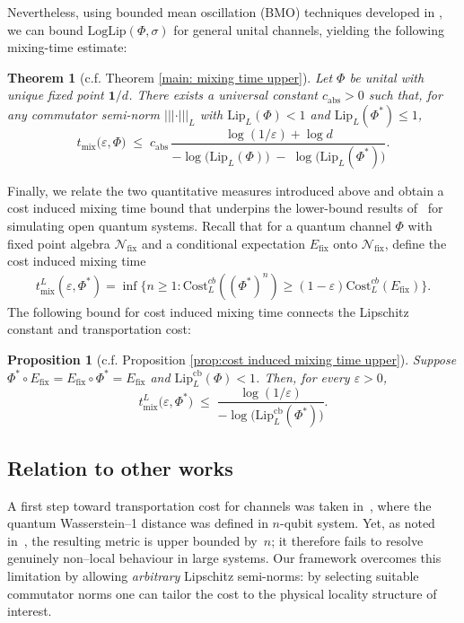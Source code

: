 \documentclass[11pt,reqno]{amsart}
\numberwithin{equation}{section}
\newtheorem{prop}[lemma]{Proposition}
\newtheorem{theorem}[lemma]{Theorem}
\newcommand{\mc}{\mathcal}
\newcommand{\Lip}{\mathrm{Lip}}
\newcommand{\Cost}{\mathrm{Cost}}
\newcommand{\fix}{\mathrm{fix}}
\begin{document}
Nevertheless, using bounded mean oscillation (BMO) techniques developed in \cite{caspers2020bmo}, we can bound $\mathrm{LogLip}(\Phi,\sigma)$ for general unital channels, yielding the following mixing-time estimate:
\begin{theorem}[c.f. Theorem \ref{main: mixing time upper}]\label{thm:mixing-time}
  Let $\Phi$ be unital with unique fixed point $\mathbf1/d$.  There exists a universal constant $c_{\mathrm{abs}}>0$ such that, for any commutator semi-norm $|||\cdot|||_{L}$ with $\Lip_{L}(\Phi)<1$ and $\Lip_{L}(\Phi^{*})\le 1$,
  \[
   t_{\mathrm{mix}}\!\bigl(\varepsilon,\Phi\bigr)
    \;\le\;
    c_{\mathrm{abs}}\,
    \frac{\log(1/\varepsilon)+\log d}
         {-\log\bigl(\Lip_{L}(\Phi)\bigr)\;-\;\log\!\bigl(\Lip_{L}(\Phi^{*})\bigr)}.
  \]
\end{theorem}
Finally, we relate the two quantitative measures introduced above and obtain a cost induced mixing time bound that underpins the lower-bound results of~\cite{ding2024lower} for simulating open quantum systems. Recall that for a quantum channel $\Phi$ with fixed point algebra $\mc N_\fix$ and a conditional expectation $E_\fix$ onto $\mc N_\fix$, define the cost induced mixing time
\begin{align*}
     t_{\mathrm{mix}}^L(\varepsilon,\Phi^*)= \inf\{n \ge 1: \Cost_L^{cb}((\Phi^*)^n)\ge (1-\varepsilon) \Cost_L^{cb}(E_\fix)\}. 
\end{align*}
The following bound for cost induced mixing time connects the Lipschitz constant and transportation cost:
\begin{prop}[c.f. Proposition \ref{prop:cost induced mixing time upper}]\label{prop:transport-mix}
  Suppose $\Phi^{*}\circ E_{\fix}=E_{\fix}\circ\Phi^{*}=E_{\fix}$ and $\Lip_{L}^{\mathrm{cb}}(\Phi)<1$.  Then, for every $\varepsilon>0$,
  \[
    t_{\mathrm{mix}}^{L}\!\bigl(\varepsilon,\Phi^{*}\bigr)
    \;\le\;
    \frac{\log(1/\varepsilon)}
         {-\log\bigl(\Lip_{L}^{\mathrm{cb}}(\Phi^{*})\bigr)}.
  \]
\end{prop}
\subsection{Relation to other works}
A first step toward transportation cost for channels was taken in~\cite{PMTL,LBKJL}, where the quantum Wasserstein–1 distance was defined in $n$-qubit system. Yet, as noted in~\cite{araiza2023}, the resulting metric is upper bounded by~$n$; it therefore fails to resolve genuinely non–local behaviour in large systems. Our framework overcomes this limitation by allowing \emph{arbitrary} Lipschitz semi-norms: by selecting suitable commutator norms one can tailor the cost to the physical locality structure of interest.
\end{document}

